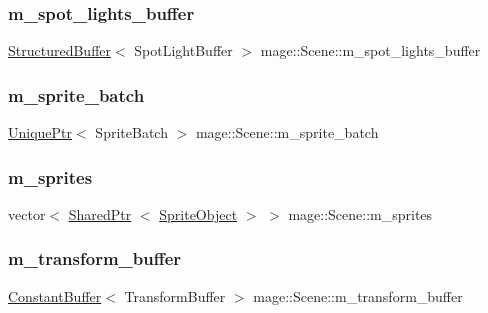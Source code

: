 \subsubsection{\texorpdfstring{m\+\_\+spot\+\_\+lights\+\_\+buffer}{m\_spot\_lights\_buffer}}
{\footnotesize\ttfamily \hyperlink{structmage_1_1_structured_buffer}{Structured\+Buffer}$<$ Spot\+Light\+Buffer $>$ mage\+::\+Scene\+::m\+\_\+spot\+\_\+lights\+\_\+buffer\hspace{0.3cm}{\ttfamily [private]}}

\hypertarget{classmage_1_1_scene_a8143ca7b1840da552d94e698010730c5}{}\label{classmage_1_1_scene_a8143ca7b1840da552d94e698010730c5} 
\subsubsection{\texorpdfstring{m\+\_\+sprite\+\_\+batch}{m\_sprite\_batch}}
{\footnotesize\ttfamily \hyperlink{namespacemage_a3316d7143a973e37adf1110f2e80ca31}{Unique\+Ptr}$<$ Sprite\+Batch $>$ mage\+::\+Scene\+::m\+\_\+sprite\+\_\+batch\hspace{0.3cm}{\ttfamily [private]}}

\hypertarget{classmage_1_1_scene_a7379b399f02999f89f6ccda5bfa01b02}{}\label{classmage_1_1_scene_a7379b399f02999f89f6ccda5bfa01b02} 
\subsubsection{\texorpdfstring{m\+\_\+sprites}{m\_sprites}}
{\footnotesize\ttfamily vector$<$ \hyperlink{namespacemage_a1e01ae66713838a7a67d30e44c67703e}{Shared\+Ptr} $<$ \hyperlink{classmage_1_1_sprite_object}{Sprite\+Object} $>$ $>$ mage\+::\+Scene\+::m\+\_\+sprites\hspace{0.3cm}{\ttfamily [private]}}

\hypertarget{classmage_1_1_scene_a2e57c981725d0a64bfc8f82381ac3d6a}{}\label{classmage_1_1_scene_a2e57c981725d0a64bfc8f82381ac3d6a} 
\subsubsection{\texorpdfstring{m\+\_\+transform\+\_\+buffer}{m\_transform\_buffer}}
{\footnotesize\ttfamily \hyperlink{structmage_1_1_constant_buffer}{Constant\+Buffer}$<$ Transform\+Buffer $>$ mage\+::\+Scene\+::m\+\_\+transform\+\_\+buffer\hspace{0.3cm}{\ttfamily [private]}}

